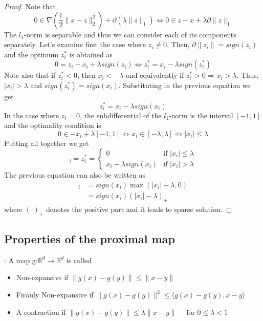 \begin{proof}
Note that
\begin{equation}
0 \in \nabla(\frac{1}{2}\|x-z\|^2_2) + \partial(\lambda\|z\|_1) \Leftrightarrow 0 \in z-x + \lambda\partial\|z\|_1
\end{equation}
The $l_1$-norm is separable and thus we can consider each of its components separately. Let's examine first the case where $z_i \neq 0$. Then, $\partial \|z_i\|=sign(z_i)$ and the optimum $z_i^*$ is obtained as
\begin{equation}
0 = z_i-x_i + \lambda sign(z_i) \Leftrightarrow z_i^* = x_i - \lambda sign(z_i^*)
\end{equation}
Note also that if $z_i^* < 0$, then $x_i < -\lambda$ and equivalently if $z_i^* > 0 \Rightarrow x_i > \lambda$. Thus, $|x_i| > \lambda$ and $sign(z_i^*) = sign(x_i)$. Substituting in the previous equation we get 
\begin{equation}
z_i^* = x_i - \lambda sign(x_i)
\end{equation}
In the case where $z_i = 0$, the subdifferential of the $l_1$-norm is the interval $[-1,1]$ and the optimality condition is
\begin{equation}
0 \in -x_i + \lambda[-1,1] \Leftrightarrow x_i \in [-\lambda,\lambda] \Leftrightarrow |x_i| \leq \lambda
\end{equation}
Putting all together we get
\begin{equation}
[prox_f(x)]_i = z_i^* = 
\left\{ \begin{array}{lr} 0 & \text{if } |x_i| \leq \lambda \\ 
x_i - \lambda sign(x_i) &\text{if } |x_i| > \lambda \end{array}\right.
\end{equation}
The previous equation can also be written as
\begin{align*}
[prox_f(x)]_i &= sign(x_i)\max(|x_i|-\lambda, 0) \\
               &= sign(x_i)(|x_i|-\lambda)_+
\end{align*}
where $(\cdot)_+$ denotes the positive part and it leads to sparse solution.
\end{proof}

\subsection{Properties of the proximal map}	
\begin{definition}
: A map g:$ \mathbb{R}^{d} \rightarrow \mathbb{R}^{d} $ is called 
\begin{itemize}
	\item Non-expansive if $ \|g(x)-g(y)\| \leqslant\|x-y\| $
	\item Firauly Non-expansive if $ \|g(x)-g(y)\|^{2} \leqslant\langle g(x)-g(y), x-y\rangle $
	\item A contraction if $ \|g(x)-g(y)\| \leqslant \lambda\|x-y\| \quad \text { for } 0 \leqslant \lambda<1 $
\end{itemize}
\end{definition}

